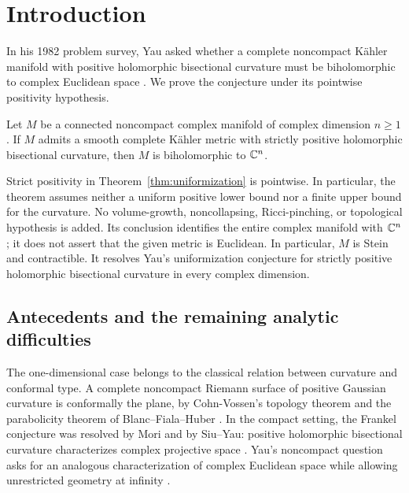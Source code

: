 \section{Introduction}\label{sec:introduction}

In his 1982 problem survey, Yau asked whether a complete noncompact
K\"ahler manifold with positive holomorphic bisectional curvature must
be biholomorphic to complex Euclidean space \cite[\S9(b), p.~45]{YauProblems}.
We prove the conjecture under its pointwise positivity hypothesis.

\begin{theorem}\label{thm:uniformization}
Let $M$ be a connected noncompact complex manifold of complex dimension
$n\geq1$. If $M$ admits a smooth complete K\"ahler metric with strictly
positive holomorphic bisectional curvature, then $M$ is biholomorphic
to $\mathbb C^n$.
\end{theorem}

Strict positivity in Theorem~\ref{thm:uniformization} is pointwise.
In particular, the theorem assumes neither a uniform positive lower
bound nor a finite upper bound for the curvature.  No volume-growth,
noncollapsing, Ricci-pinching, or topological hypothesis is added.
Its conclusion identifies the entire complex manifold with $\mathbb C^n$;
it does not assert that the given metric is Euclidean.
In particular, $M$ is Stein and contractible.
It resolves Yau's uniformization conjecture for strictly positive
holomorphic bisectional curvature in every complex dimension.

\subsection{Antecedents and the remaining analytic difficulties}

The one-dimensional case belongs to the classical relation between
curvature and conformal type. A complete noncompact Riemann surface
of positive Gaussian curvature is conformally the plane, by
Cohn-Vossen's topology theorem and the parabolicity theorem of
Blanc--Fiala--Huber \cite[Satz~8]{CohnVossen}\cite[Theorem~15]{Huber}.
In the compact setting, the Frankel conjecture was resolved by
Mori and by Siu--Yau: positive holomorphic bisectional curvature
characterizes complex projective space \cite{MoriAmple,SiuYauFrankel}.
Yau's noncompact question asks for an analogous characterization
of complex Euclidean space while allowing unrestricted geometry
at infinity \cite[\S9(b), p.~45]{YauProblems}.

